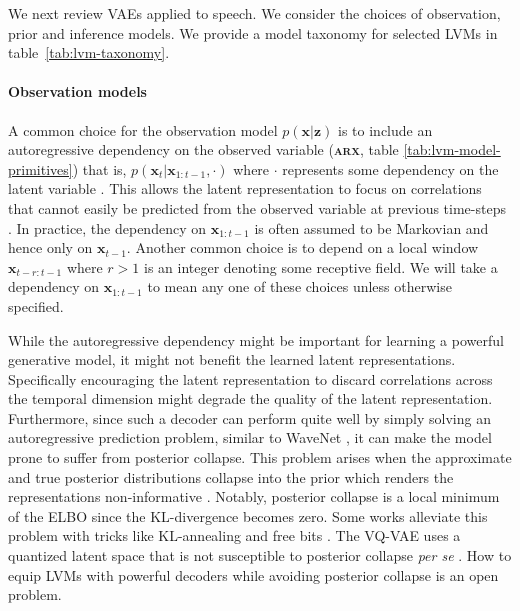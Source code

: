 We next review VAEs applied to speech. We consider the choices of observation, prior and inference models.
We provide a model taxonomy for selected LVMs in table~\ref{tab:lvm-taxonomy}.




\paragraph{Observation models} 
A common choice for the observation model $p(\mathbf{x}|\mathbf{z})$ is to include an autoregressive dependency on the observed variable (\textbf{\textsc{arx}}, table \ref{tab:lvm-model-primitives}) that is, $p(\mathbf{x}_t|\mathbf{x}_{1:t-1}, \cdot)$ where $\cdot$ represents some dependency on the latent variable \cite{chung_recurrent_2015, fraccaro_sequential_2016, oord_neural_2018, oord2018representation}. This allows the latent representation to focus on correlations that cannot easily be predicted from the observed variable at previous time-steps \cite{oord2018representation}. In practice, the dependency on $\mathbf{x}_{1:t-1}$ is often assumed to be Markovian and hence only on $\mathbf{x}_{t-1}$. Another common choice is to depend on a local window $\mathbf{x}_{t-r:t-1}$ where $r>1$ is an integer denoting some receptive field. We will take a dependency on $\mathbf{x}_{1:t-1}$ to mean any one of these choices unless otherwise specified.

While the autoregressive dependency might be important for learning a powerful generative model, it might not benefit the learned latent representations. Specifically encouraging the latent representation to discard correlations across the temporal dimension might degrade the quality of the latent representation.
Furthermore, since such a decoder can perform quite well by simply solving an autoregressive prediction problem, similar to WaveNet \cite{oord_wavenet:_2016}, it can make the model prone to suffer from posterior collapse. This problem arises when the approximate and true posterior distributions collapse into the prior which renders the representations non-informative \cite{bowman_generating_2016, sonderby_ladder_2016}. Notably, posterior collapse is a local minimum of the ELBO since the KL-divergence becomes zero. 
Some works alleviate this problem with tricks like KL-annealing and free bits \cite{bowman_generating_2016, sonderby_ladder_2016, kingma_improved_2016}. 
The VQ-VAE uses a quantized latent space that is not susceptible to posterior collapse \textit{per se} \cite{oord_neural_2018}. How to equip LVMs with powerful decoders while avoiding posterior collapse is an open problem.

